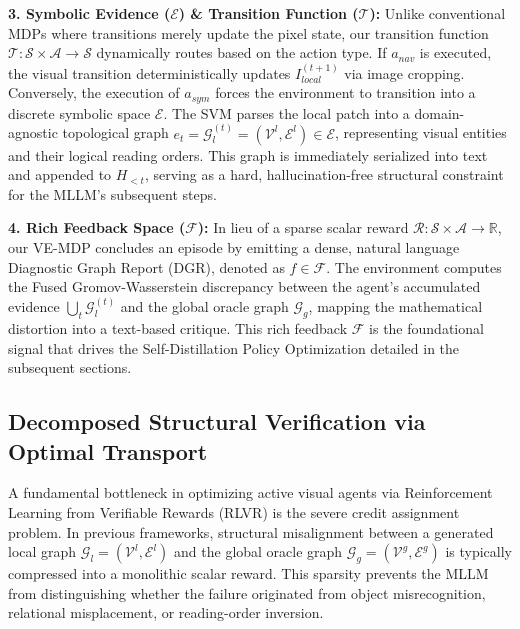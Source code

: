 \documentclass{article}
\begin{document}
\textbf{3. Symbolic Evidence ($\mathcal{E}$) \& Transition Function ($\mathcal{T}$):} 
Unlike conventional MDPs where transitions merely update the pixel state, our transition function $\mathcal{T}: \mathcal{S} \times \mathcal{A} \rightarrow \mathcal{S}$ dynamically routes based on the action type. If $a_{nav}$ is executed, the visual transition deterministically updates $I_{local}^{(t+1)}$ via image cropping. Conversely, the execution of $a_{sym}$ forces the environment to transition into a discrete symbolic space $\mathcal{E}$. The SVM parses the local patch into a domain-agnostic topological graph $e_t = \mathcal{G}_{l}^{(t)} = (\mathcal{V}^l, \mathcal{E}^l) \in \mathcal{E}$, representing visual entities and their logical reading orders. This graph is immediately serialized into text and appended to $H_{<t}$, serving as a hard, hallucination-free structural constraint for the MLLM's subsequent steps.

\textbf{4. Rich Feedback Space ($\mathcal{F}$):} 
In lieu of a sparse scalar reward $\mathcal{R}:\mathcal{S}\times\mathcal{A}\rightarrow\mathbb{R}$, our VE-MDP concludes an episode by emitting a dense, natural language Diagnostic Graph Report (DGR), denoted as $f \in \mathcal{F}$. The environment computes the Fused Gromov-Wasserstein discrepancy between the agent's accumulated evidence $\bigcup_t \mathcal{G}_l^{(t)}$ and the global oracle graph $\mathcal{G}_g$, mapping the mathematical distortion into a text-based critique. This rich feedback $\mathcal{F}$ is the foundational signal that drives the Self-Distillation Policy Optimization detailed in the subsequent sections.

\subsection{Decomposed Structural Verification via Optimal Transport}
\label{subsec:decomposed-verification}

A fundamental bottleneck in optimizing active visual agents via Reinforcement Learning from Verifiable Rewards (RLVR) is the severe credit assignment problem. In previous frameworks, structural misalignment between a generated local graph $\mathcal{G}_l = (\mathcal{V}^l, \mathcal{E}^l)$ and the global oracle graph $\mathcal{G}_g = (\mathcal{V}^g, \mathcal{E}^g)$ is typically compressed into a monolithic scalar reward. This sparsity prevents the MLLM from distinguishing whether the failure originated from object misrecognition, relational misplacement, or reading-order inversion.
\end{document}
